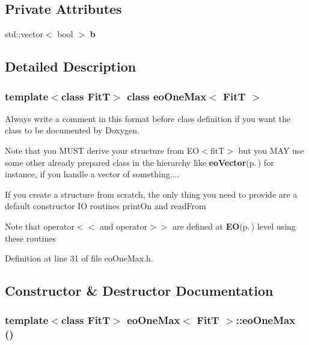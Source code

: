 \subsection*{Private Attributes}
\begin{CompactItemize}
\item 
std::vector$<$ bool $>$ {\bf b}\label{classeo_one_max_r0}

\end{CompactItemize}


\subsection{Detailed Description}
\subsubsection*{template$<$class Fit\-T$>$ class eo\-One\-Max$<$ Fit\-T $>$}

Always write a comment in this format before class definition if you want the class to be documented by Doxygen. 

Note that you MUST derive your structure from EO$<$fit\-T$>$ but you MAY use some other already prepared class in the hierarchy like {\bf eo\-Vector}{\rm (p.\,\pageref{classeo_vector})} for instance, if you handle a vector of something....

If you create a structure from scratch, the only thing you need to provide are a default constructor IO routines print\-On and read\-From

Note that operator$<$$<$ and operator$>$$>$ are defined at {\bf EO}{\rm (p.\,\pageref{class_e_o})} level using these routines 



Definition at line 31 of file eo\-One\-Max.h.

\subsection{Constructor \& Destructor Documentation}
\subsubsection{\setlength{\rightskip}{0pt plus 5cm}template$<$class Fit\-T$>$ {\bf eo\-One\-Max}$<$ {\bf Fit\-T} $>$::{\bf eo\-One\-Max} ()\hspace{0.3cm}{\tt  [inline]}}\label{classeo_one_max_a0}


